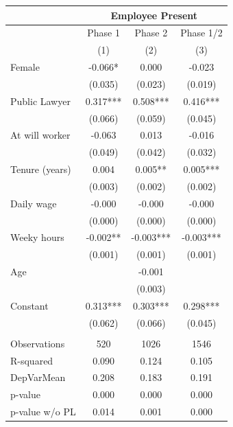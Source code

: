 \begin{tabular}{lccc}
\toprule
      & \multicolumn{3}{c}{Employee Present} \\
\midrule
\midrule
      & Phase 1 & Phase 2 & Phase 1/2 \\
\midrule
\midrule
      & (1)   & (2)   & (3) \\
\midrule
\midrule
Female & -0.066* & 0.000 & -0.023 \\
      & (0.035) & (0.023) & (0.019) \\
Public Lawyer & 0.317*** & 0.508*** & 0.416*** \\
      & (0.066) & (0.059) & (0.045) \\
At will worker & -0.063 & 0.013 & -0.016 \\
      & (0.049) & (0.042) & (0.032) \\
Tenure (years) & 0.004 & 0.005** & 0.005*** \\
      & (0.003) & (0.002) & (0.002) \\
Daily wage & -0.000 & -0.000 & -0.000 \\
      & (0.000) & (0.000) & (0.000) \\
Weeky hours & -0.002** & -0.003*** & -0.003*** \\
      & (0.001) & (0.001) & (0.001) \\
Age   &       & -0.001 &  \\
      &       & (0.003) &  \\
Constant & 0.313*** & 0.303*** & 0.298*** \\
      & (0.062) & (0.066) & (0.045) \\
      &       &       &  \\
\midrule
Observations & 520   & 1026  & 1546 \\
R-squared & 0.090 & 0.124 & 0.105 \\
DepVarMean & 0.208 & 0.183 & 0.191 \\
p-value & 0.000 & 0.000 & 0.000 \\
p-value w/o PL & 0.014 & 0.001 & 0.000 \\
\bottomrule
\bottomrule
\end{tabular}%
